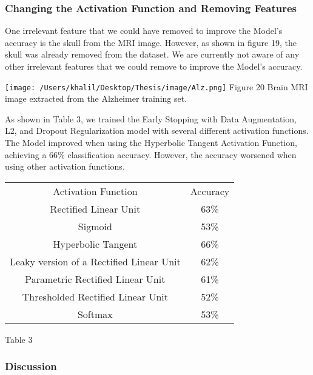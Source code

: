 \documentclass[oneside,12pt,article]{article}
\begin{document}
\subsubsection{Changing the Activation Function and Removing Features }
One irrelevant feature that we could have removed to improve the Model's accuracy is the skull from the MRI image. However, as shown in figure 19, the skull was already removed from the dataset. We are currently not aware of any other irrelevant features that we could remove to improve the Model's accuracy. 


 \begin{center}
\texttt{[image: /Users/khalil/Desktop/Thesis/image/Alz.png]} 
\newline
Figure 20 Brain MRI image extracted from the Alzheimer training set. 
\end{center}
As shown in Table 3, we trained the Early Stopping with Data Augmentation, L2, and Dropout Regularization model with several different activation functions. The Model improved when using the Hyperbolic Tangent Activation Function, achieving a 66\% classification accuracy. However, the accuracy worsened when using other activation functions. 

\begin{center}
\begin{tabular}{ |c|c|} 
\hline
Activation Function & Accuracy \\ 
Rectified Linear Unit & 63\% \\
Sigmoid & 53\% \\ 
Hyperbolic Tangent & 66\% \\ 
Leaky version of a Rectified Linear Unit & 62\% \\  
Parametric Rectified Linear Unit & 61\% \\ 
Thresholded Rectified Linear Unit & 52\% \\ 
Softmax & 53\% \\
 

\hline
\end{tabular}
\begin{center}
 Table 3
 \end{center}
\end{center}

\subsubsection{Discussion}
\end{document}
